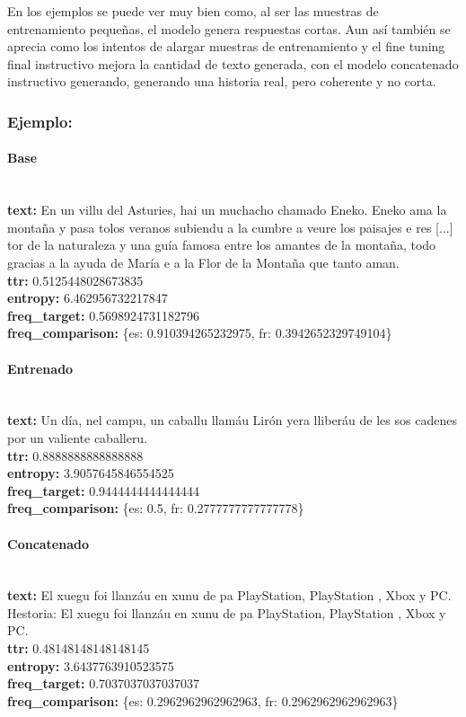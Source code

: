 En los ejemplos se puede ver muy bien como, al ser las muestras de entrenamiento pequeñas, el modelo genera respuestas cortas. Aun así también se aprecia como los intentos de alargar muestras de entrenamiento y el fine tuning final instructivo mejora la cantidad de texto generada, con el modelo concatenado instructivo generando, generando una historia real, pero coherente y no corta. 

\subsubsection{Ejemplo:}

\paragraph{Base}~\\
\textbf{text:} En un villu del Asturies, hai un muchacho chamado Eneko. Eneko ama la montaña y pasa tolos veranos subiendu a la cumbre a veure los paisajes e res [...] tor de la naturaleza y una guía famosa entre los amantes de la montaña, todo gracias a la ayuda de María e a la Flor de la Montaña que tanto aman.\\
\textbf{ttr:} 0.5125448028673835\\
\textbf{entropy:} 6.462956732217847\\
\textbf{freq\_target:} 0.5698924731182796\\
\textbf{freq\_comparison:} \{\textquotesingle{}es\textquotesingle{}: 0.910394265232975, \textquotesingle{}fr\textquotesingle{}: 0.3942652329749104\}

\paragraph{Entrenado}~\\
\textbf{text:} Un día, nel campu, un caballu llamáu Lirón yera lliberáu de les sos cadenes por un valiente caballeru.\\
\textbf{ttr:} 0.8888888888888888\\
\textbf{entropy:} 3.9057645846554525\\
\textbf{freq\_target:} 0.9444444444444444\\
\textbf{freq\_comparison:} \{\textquotesingle{}es\textquotesingle{}: 0.5, \textquotesingle{}fr\textquotesingle{}: 0.2777777777777778\}

\paragraph{Concatenado}~\\
\textbf{text:} El xuegu foi llanzáu en xunu de pa PlayStation, PlayStation , Xbox y PC. Hestoria: El xuegu foi llanzáu en xunu de pa PlayStation, PlayStation , Xbox y PC.\\
\textbf{ttr:} 0.48148148148148145\\
\textbf{entropy:} 3.6437763910523575\\
\textbf{freq\_target:} 0.7037037037037037\\
\textbf{freq\_comparison:} \{\textquotesingle{}es\textquotesingle{}: 0.2962962962962963, \textquotesingle{}fr\textquotesingle{}: 0.2962962962962963\}

